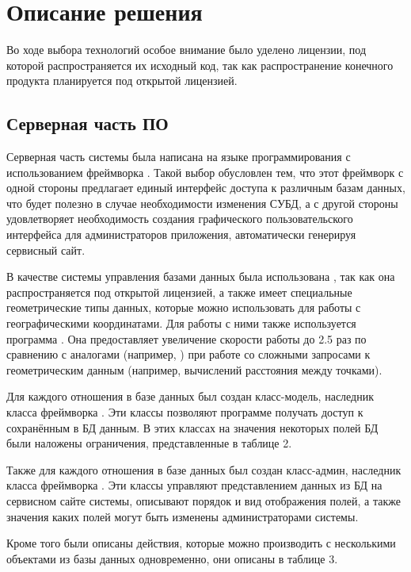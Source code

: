 
\section{Описание решения}

\tab
Во ходе выбора технологий особое внимание было уделено лицензии, под которой распространяется их исходный код, так как распространение конечного продукта планируется под открытой лицензией.

\subsection{Серверная часть ПО}

\tab
Серверная часть системы была написана на языке программирования  с использованием фреймворка .
Такой выбор обусловлен тем, что этот фреймворк с одной стороны предлагает единый интерфейс доступа к различным базам данных, что будет полезно в случае необходимости изменения СУБД, а с другой стороны удовлетворяет необходимость создания графического пользовательского интерфейса для администраторов приложения, автоматически генерируя сервисный сайт.

\tab
В качестве системы управления базами данных была использована , так как она распространяется под открытой лицензией, а также имеет специальные геометрические типы данных, которые можно использовать для работы с географическими координатами.
Для работы с ними также используется программа .
Она предоставляет увеличение скорости работы до 2.5 раз по сравнению с аналогами (например, ) при работе со сложными запросами к геометрическим данным (например, вычислений расстояния между точками)\cite{postgis-vs-mongo}.

\tab
Для каждого отношения в базе данных был создан класс-модель, наследник класса  фреймворка .
Эти классы позволяют программе получать доступ к сохранённым в БД данным.
В этих классах на значения некоторых полей БД были наложены ограничения, представленные в таблице 2.
\tabletwo

\tab
Также для каждого отношения в базе данных был создан класс-админ, наследник класса  фреймворка .
Эти классы управляют представлением данных из БД на сервисном сайте системы, описывают порядок и вид отображения полей, а также значения каких полей могут быть изменены администраторами системы.

\tab
Кроме того были описаны действия, которые можно производить с несколькими объектами из базы данных одновременно, они описаны в таблице 3.
\tablethree

